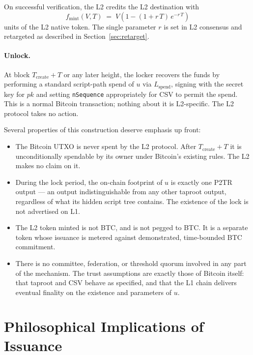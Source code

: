 \documentclass[11pt,a4paper]{article}
\newcommand{\fmint}{f_{\mathrm{mint}}}
\begin{document}
On successful verification, the L2 credits the L2 destination with
\begin{equation}
\label{eq:mintfn}
\fmint(V, T) \;=\; V\!\left(1 - (1 + r\,T)\,e^{-r\,T}\right)
\end{equation}
units of the L2 native token. The single parameter $r$ is set in L2 consensus and retargeted as described in Section~\ref{sec:retarget}.

\paragraph{Unlock.} At block $T_{\mathrm{create}} + T$ or any later height, the locker recovers the funds by performing a standard script-path spend of $u$ via $L_{\mathrm{spend}}$, signing with the secret key for $pk$ and setting \texttt{nSequence} appropriately for CSV to permit the spend. This is a normal Bitcoin transaction; nothing about it is L2-specific. The L2 protocol takes no action.

Several properties of this construction deserve emphasis up front:

\begin{itemize}[leftmargin=*]
  \item The Bitcoin UTXO is never spent by the L2 protocol. After $T_{\mathrm{create}} + T$ it is unconditionally spendable by its owner under Bitcoin's existing rules. The L2 makes no claim on it.
  \item During the lock period, the on-chain footprint of $u$ is exactly one P2TR output --- an output indistinguishable from any other taproot output, regardless of what its hidden script tree contains. The existence of the lock is not advertised on L1.
  \item The L2 token minted is not BTC, and is not pegged to BTC. It is a separate token whose issuance is metered against demonstrated, time-bounded BTC commitment.
  \item There is no committee, federation, or threshold quorum involved in any part of the mechanism. The trust assumptions are exactly those of Bitcoin itself: that taproot and CSV behave as specified, and that the L1 chain delivers eventual finality on the existence and parameters of $u$.
\end{itemize}

\section{Philosophical Implications of Issuance}
\label{sec:philosophy}
\end{document}
